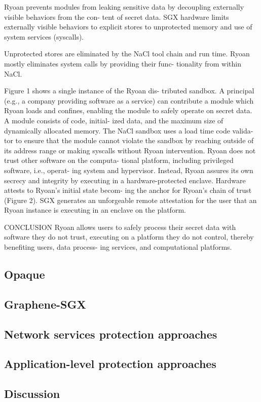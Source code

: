 \begin{itemize}
Ryoan prevents modules from leaking sensitive data
by decoupling externally visible behaviors from the con-
tent of secret data. SGX hardware limits externally visible
behaviors to explicit stores to unprotected memory and use of system services (syscalls).

Unprotected stores are
eliminated by the NaCl tool chain and run time. Ryoan
mostly eliminates system calls by providing their func-
tionality from within NaCl.

Figure 1 shows a single instance of the Ryoan dis-
tributed sandbox. A principal (e.g., a company providing
software as a service) can contribute a module which
Ryoan loads and confines, enabling the module to safely
operate on secret data. A module consists of code, initial-
ized data, and the maximum size of dynamically allocated
memory. The NaCl sandbox uses a load time code valida-
tor to ensure that the module cannot violate the sandbox
by reaching outside of its address range or making syscalls
without Ryoan intervention.
Ryoan does not trust other software on the computa-
tional platform, including privileged software, i.e., operat-
ing system and hypervisor. Instead, Ryoan assures its own
secrecy and integrity by executing in a hardware-protected
enclave. Hardware attests to Ryoan’s initial state becom-
ing the anchor for Ryoan’s chain of trust (Figure 2). SGX
generates an unforgeable remote attestation for the user
that an Ryoan instance is executing in an enclave on the
platform.

CONCLUSION
Ryoan allows users to safely process their secret data
with software they do not trust, executing on a platform
they do not control, thereby benefiting users, data process-
ing services, and computational platforms.
\subsection{Opaque}
\subsection{Graphene-SGX}
\subsection{Network services protection approaches}
\subsection{Application-level protection approaches}
\subsection{Discussion}



\end{itemize}
